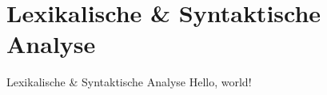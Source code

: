 \section{Lexikalische \& Syntaktische Analyse}
\begin{frame}{Lexikalische \& Syntaktische Analyse}
	Hello, world!
	\cite{Jeffery2021}
	\cite{Watson2017}
	\cite{Sendil2022-fy}
\end{frame}
